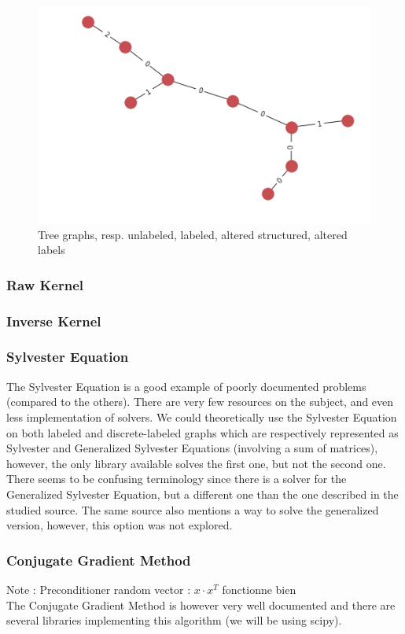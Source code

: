 \documentclass{article}
\theoremstyle{definition}
\begin{document}
\begin{figure}[!htb]
\begin{multicols}{4}
		\includegraphics[width=\linewidth]{data/generated-graphs/tree_altered_labels.png}\par
	\end{multicols}
	\caption{Tree graphs, resp. unlabeled, labeled, altered structured, altered labels}
\end{figure}
\subsubsection{Raw Kernel}
\subsubsection{Inverse Kernel}
\subsubsection{Sylvester Equation}
The Sylvester Equation is a good example of poorly documented problems (compared to the others). There are very few resources on the subject, and even less implementation of solvers. We could theoretically use the Sylvester Equation on both labeled and discrete-labeled graphs which are respectively represented as Sylvester and Generalized Sylvester Equations (involving a sum of matrices), however, the only library available solves the first one, but not the second one. There seems to be confusing terminology since there is a solver for the Generalized Sylvester Equation, but a different one than the one described in the studied source\cite{vishwanathan_graph_2010}. The same source also mentions a way to solve the generalized version\cite{lathauwer2004}, however, this option was not explored.  
\subsubsection{Conjugate Gradient Method}
Note : Preconditioner random vector : $x \cdot x^{T}$ fonctionne bien\\
The Conjugate Gradient Method is however very well documented\cite{nesterov_lectures_2018} and there are several libraries implementing this algorithm (we will be using scipy).
\end{document}
